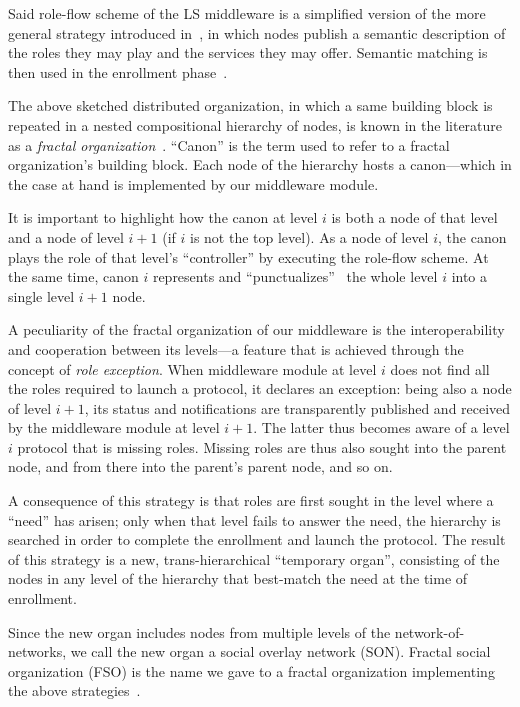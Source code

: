 \documentclass[twocolumn]{svjour3}
\begin{document}
Said role-flow scheme of the LS middleware is a simplified version of the
more general strategy introduced in~\cite{DF13c,DeBl10},
in which nodes publish a semantic description of the roles they may play and the services they
may offer. Semantic matching is then used in the enrollment phase~\cite{SDB13a}.

The above sketched distributed organization, in which a same building block is repeated
in a nested compositional hierarchy of nodes,
is known in the literature as a \emph{fractal organization}~\cite{Koe67,Warnecke93,Tharu96,TWN1998}.
``Canon'' is the term used to refer to a fractal organization's building block.
Each node of the hierarchy hosts a canon---which in the case at hand is implemented by our middleware module.

It is important to highlight how the canon at level $i$ is both a node of that level and
a node of level $i+1$ (if $i$ is not the top level). As a node of level $i$, the canon
plays the role of that level's ``controller'' by executing the role-flow scheme.
At the same time, canon $i$ represents and
``punctualizes''~\cite{Law92} the whole level $i$ into a single level $i+1$ node.

A peculiarity of the fractal organization of our middleware
is the interoperability and cooperation between its levels---a feature that is achieved through the concept of 
\emph{role exception}. When middleware module at level $i$ does not find all the roles
required to launch a protocol, it declares
an exception: being also a node of level $i+1$, its status and notifications are transparently
published and received by the middleware module at level $i+1$. The latter thus becomes
aware of a level $i$ protocol that is missing roles.
Missing roles are thus also sought into the parent node, and from there into the parent's parent node,
and so on.

A consequence of this strategy is that roles are first sought in the level where a ``need'' has
arisen; only when that level fails to answer the need, the hierarchy is searched in order
to complete the enrollment and launch the protocol. The result of this strategy is a new,
trans-hierarchical ``temporary organ'', consisting of the nodes in any level of the hierarchy
that best-match the need at the time of enrollment.

Since the new organ includes nodes from multiple levels of the network-of-networks, we call the new
organ a
social overlay network (SON). Fractal social organization (FSO) is the name we gave to
a fractal organization implementing the above strategies~\cite{DF13c}.
\end{document}
